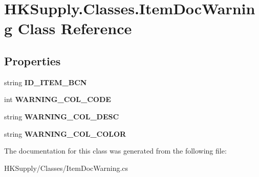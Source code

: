 \hypertarget{class_h_k_supply_1_1_classes_1_1_item_doc_warning}{}\section{H\+K\+Supply.\+Classes.\+Item\+Doc\+Warning Class Reference}
\label{class_h_k_supply_1_1_classes_1_1_item_doc_warning}
\subsection*{Properties}
\begin{DoxyCompactItemize}
\item 
\mbox{\label{class_h_k_supply_1_1_classes_1_1_item_doc_warning_a9f4d2eef74b88785b4ea17a033489880}} 
string {\bfseries I\+D\+\_\+\+I\+T\+E\+M\+\_\+\+B\+CN}
\item 
\mbox{\label{class_h_k_supply_1_1_classes_1_1_item_doc_warning_a3614d83a40b6b0b6fa6115a538b88f48}} 
int {\bfseries W\+A\+R\+N\+I\+N\+G\+\_\+\+C\+O\+L\+\_\+\+C\+O\+DE}
\item 
\mbox{\label{class_h_k_supply_1_1_classes_1_1_item_doc_warning_a5a5db189db3e3184985a25ff0953c894}} 
string {\bfseries W\+A\+R\+N\+I\+N\+G\+\_\+\+C\+O\+L\+\_\+\+D\+E\+SC}
\item 
\mbox{\label{class_h_k_supply_1_1_classes_1_1_item_doc_warning_aafe26269fff73612e58996f3e70fef1e}} 
string {\bfseries W\+A\+R\+N\+I\+N\+G\+\_\+\+C\+O\+L\+\_\+\+C\+O\+L\+OR}
\end{DoxyCompactItemize}


The documentation for this class was generated from the following file\+:\begin{DoxyCompactItemize}
\item 
H\+K\+Supply/\+Classes/Item\+Doc\+Warning.\+cs\end{DoxyCompactItemize}
